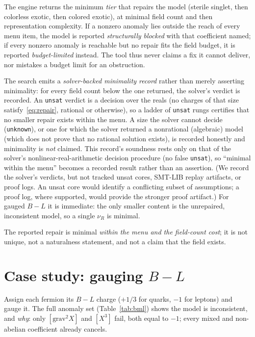 \documentclass[11pt]{article}
\begin{document}
The engine returns the minimum \emph{tier} that repairs the model (sterile
singlet, then colorless exotic, then colored exotic), at minimal field count and
then representation complexity. If a nonzero anomaly lies outside the reach of
every menu item, the model is reported \emph{structurally blocked} with that
coefficient named; if every nonzero anomaly is reachable but no repair fits the
field budget, it is reported \emph{budget-limited} instead. The tool thus never
claims a fix it cannot deliver, nor mistakes a budget limit for an obstruction.

The search emits a \emph{solver-backed minimality record} rather than merely
asserting minimality: for every field count below the one returned, the solver's
verdict is recorded. An \texttt{unsat} verdict is a decision over the reals (no charges of
that size satisfy~\eqref{eq:repair}, rational or otherwise), so a ladder of
\texttt{unsat} rungs certifies that no smaller repair exists within the menu. A
size the solver cannot decide (\texttt{unknown}), or one for which the solver
returned a nonrational (algebraic) model (which does not prove that no
rational solution exists), is recorded honestly and minimality is \emph{not} claimed.
This record's soundness rests only on that of the solver's
nonlinear-real-arithmetic decision procedure (no false \texttt{unsat}), so
``minimal within the menu'' becomes a recorded result rather than an assertion.
(We record the solver's verdicts, but not tracked unsat cores, SMT-LIB replay
artifacts, or proof logs. An unsat core would identify a conflicting subset of
assumptions; a proof log, where supported, would provide the stronger proof
artifact.) For gauged $B\!-\!L$ it is immediate: the only smaller content is the
unrepaired, inconsistent model, so a single $\nu_R$ is minimal.

The reported repair is minimal \emph{within the menu and the field-count cost};
it is not unique, not a naturalness statement, and not a claim that the field
exists.

\section{\texorpdfstring{Case study: gauging $B\!-\!L$}{Case study: gauging B-L}}
\label{sec:casestudy}

Assign each fermion its $B\!-\!L$ charge ($+1/3$ for quarks, $-1$ for leptons)
and gauge it. The full anomaly set (Table~\ref{tab:bml}) shows the model is
inconsistent, and \emph{why}: only $[\text{grav}^2 X]$ and $[X^3]$ fail, both
equal to $-1$; every mixed and non-abelian coefficient already cancels.
\end{document}
